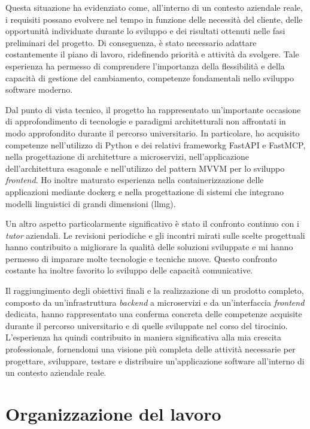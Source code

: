 Questa situazione ha evidenziato come, all'interno di un contesto aziendale reale,
i requisiti possano evolvere nel tempo in funzione delle necessità del cliente,
delle opportunità individuate durante lo sviluppo e dei risultati ottenuti nelle
fasi preliminari del progetto. Di conseguenza, è stato necessario adattare
costantemente il piano di lavoro, ridefinendo priorità e attività da svolgere.
Tale esperienza ha permesso di comprendere l'importanza della flessibilità e della
capacità di gestione del cambiamento, competenze fondamentali nello sviluppo
software moderno.

Dal punto di vista tecnico, il progetto ha rappresentato un'importante occasione
di approfondimento di tecnologie e paradigmi architetturali non affrontati in modo
approfondito durante il percorso universitario. In particolare, ho acquisito
competenze nell'utilizzo di Python e dei relativi \gls{frameworkg} FastAPI e FastMCP, nella progettazione di architetture a microservizi, nell'applicazione dell'architettura esagonale e nell'utilizzo del pattern MVVM per lo sviluppo \textit{frontend}. Ho inoltre maturato esperienza nella containerizzazione delle applicazioni mediante \gls{dockerg} e nella progettazione di sistemi che integrano modelli linguistici di grandi dimensioni (\gls{llmg}).

Un altro aspetto particolarmente significativo è stato il confronto continuo con
i \textit{tutor} aziendali. Le revisioni periodiche e gli incontri mirati sulle scelte
progettuali hanno contribuito a migliorare la qualità delle soluzioni sviluppate
e mi hanno permesso di imparare molte tecnologie e tecniche nuove. 
Questo confronto costante ha inoltre favorito lo sviluppo
delle capacità comunicative.

Il raggiungimento degli obiettivi finali e la realizzazione di un prodotto completo,
composto da un'infrastruttura \textit{backend} a microservizi e da un'interfaccia
\textit{frontend} dedicata, hanno rappresentato una conferma concreta delle
competenze acquisite durante il percorso universitario e di quelle sviluppate nel
corso del tirocinio. L'esperienza ha quindi contribuito in maniera significativa
alla mia crescita professionale, fornendomi una visione più completa delle attività
necessarie per progettare, sviluppare, testare e distribuire un'applicazione software
all'interno di un contesto aziendale reale.


\section{Organizzazione del lavoro}
